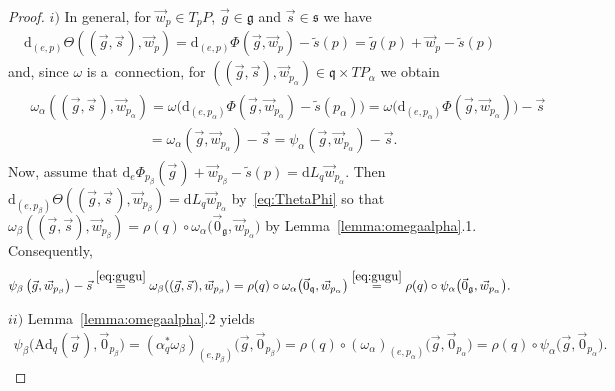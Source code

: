 \documentclass[11pt]{article}
\numberwithin{equation}{section}
\newcommand{\Co}[1]{\alpha_{#1}}
\newcommand{\wt}[1]{\widetilde{#1}}
\newcommand{\Add}[1]{\mathrm{Ad}_{#1}}
\begin{document}
\begin{proof}
$i)$ In general, for $\vec{w}_p\in T_pP$, $\vec{g}\in\mathfrak{g}$ and $\vec{s}\in\mathfrak{s}$ we have
\begin{gather}
\label{eq:ThetaPhi}
\mathrm{d}_{(e,p)}\Theta((\vec{g},\vec{s}\hspace{1pt}),\vec{w}_p)
=\mathrm{d}_{(e,p)}\Phi(\vec{g},\vec{w}_p)-\wt{s}(p)=\wt{g}(p)+\vec{w}_p-\wt{s}(p)
\end{gather}
and, since $\omega$ is a~connection, for $((\vec{g},\vec{s}),\vec{w}_{p_\alpha})\in \mathfrak{q}\times TP_\alpha$ we
obtain{\samepage
\begin{gather}
\begin{split}
& \omega_\alpha((\vec{g},\vec{s}\hspace{1pt}),\vec{w}_{p_\alpha})
=\omega\big(\mathrm{d}_{(e,p_\alpha)}\Phi(\vec{g},\vec{w}_{p_\alpha})-\wt{s}(p_\alpha)\big)
=\omega\big(\mathrm{d}_{(e,p_\alpha)}\Phi(\vec{g},\vec{w}_{p_\alpha})\big)-\vec{s}
\\
&\phantom{\omega_\alpha((\vec{g},\vec{s}),\vec{w}_{p_\alpha})}
=\omega_\alpha\left(\vec{g},\vec{w}_{p_\alpha}\right)-\vec{s}
=\psi_\alpha\left(\vec{g},\vec{w}_{p_\alpha}\right)-\vec{s}.
\end{split} \label{eq:gugu}
\end{gather}
Now,} assume that $\mathrm{d}_e\Phi_{p_\beta}(\vec{g}\hspace{1pt})+\vec{w}_{p_\beta}-\wt{s}(p)=\mathrm{d}
L_q\vec{w}_{p_\alpha}$.
Then $\mathrm{d}_{(e,p_\beta)}\Theta((\vec{g},\vec{s}\hspace{1pt}),\vec{w}_{p_\beta})=\mathrm{d} L_q \vec{w}_{p_\alpha}$
by~\eqref{eq:ThetaPhi} so that $\omega_\beta((\vec{g},\vec{s}),\vec{w}_{p_\beta})=\rho(q)\circ
\omega_\alpha\big(\vec{0}_{\mathfrak{g}},\vec{w}_{p_\alpha}\big)$ by Lemma~\ref{lemma:omegaalpha}.1.
Consequently,
\begin{gather*}
\psi_\beta\left(\vec{g},\vec{w}_{p_\beta}\right)-\vec{s}
\stackrel{\eqref{eq:gugu}}{=}\omega_\beta((\vec{g},\vec{s}\hspace{1pt}),\vec{w}_{p_\beta})
=\rho(q)\circ
\omega_\alpha\big(\vec{0}_\mathfrak{q},\vec{w}_{p_\alpha}\big)\stackrel{\eqref{eq:gugu}}{=}\rho(q)\circ
\psi_\alpha\big(\vec{0}_{\mathfrak{g}},\vec{w}_{p_\alpha}\big).
\end{gather*}

$ii)$ Lemma~\ref{lemma:omegaalpha}.2 yields
\begin{gather*}
\psi_\beta\big(\Add{q}(\vec{g}\hspace{1pt}),\vec{0}_{p_\beta}\big)
=(\Co{q}^{*}\omega_\beta)_{(e,p_\beta)}\big(\vec{g},\vec{0}_{p_\beta}\big)
=\rho(q)\circ (\omega_\alpha)_{(e,p_\alpha)}\big(\vec{g},\vec{0}_{p_\alpha}\big) =\rho(q)\circ
\psi_\alpha\big(\vec{g},\vec{0}_{p_\alpha}\big).\!\!\!\!\tag*{\qed}
\end{gather*}
\renewcommand{\qed}{}
\end{proof}
\end{document}
